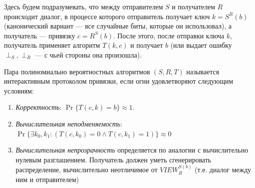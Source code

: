 Здесь будем подразумевать, что между отправителем \(S\) и получателем \(R\) происходит диалог, в процессе которого отправитель получает ключ \(k = S^R(b)\) (канонический вариант --- все случайные биты, которые он использовал), а получатель --- привязку \(c = R^S(b)\). После этого, после отправки ключа \(k\), получатель применяет алгоритм \(T(k, c)\) и получает \(b\) (или выдает ошибку \(\perp_S, \perp_R\) --- с чьей стороны она произошла).

\begin{definition}
    Пара полиномиально вероятностных алгоритмов \((S, R, T)\) называется интерактивным протоколом привязки, если огни удовлетворяют следующим условиям:
    \begin{enumerate}
        \item \emph{Корректность}: \(\Pr\{T(c, k) = b\} \approx 1\).
        \item \emph{Вычислительная неподменяемость}: \(\Pr\{\exists k_0, k_1: (T(c, k_0) = 0 \wedge T(c, k_1) = 1)\} \approx 0\)
        \item \emph{Вычислительная непрозрачность} определяется по аналогии с вычислительно нулевым разглашением. Получатель должен уметь сгенерировать распределение, вычислительно неотличимое от \(VIEW_R^{S(b)}\) (т.е. диалог между ним и отправителем)
    \end{enumerate}
\end{definition}

